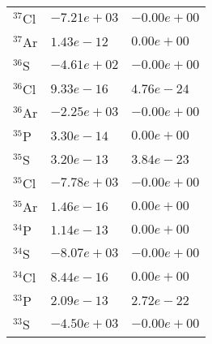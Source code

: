 \begin{tabular}{lll}
 $^{37}$Cl & $-7.21e+03 $                                                       & $-0.00e+00 $                                                          \\
 $^{37}$Ar & $1.43e-12 $                                                        & $0.00e+00 $                                                           \\
 $^{36}$S  & $-4.61e+02 $                                                       & $-0.00e+00 $                                                          \\
 $^{36}$Cl & $9.33e-16 $                                                        & $4.76e-24 $                                                           \\
 $^{36}$Ar & $-2.25e+03 $                                                       & $-0.00e+00 $                                                          \\
 $^{35}$P  & $3.30e-14 $                                                        & $0.00e+00 $                                                           \\
 $^{35}$S  & $3.20e-13 $                                                        & $3.84e-23 $                                                           \\
 $^{35}$Cl & $-7.78e+03 $                                                       & $-0.00e+00 $                                                          \\
 $^{35}$Ar & $1.46e-16 $                                                        & $0.00e+00 $                                                           \\
 $^{34}$P  & $1.14e-13 $                                                        & $0.00e+00 $                                                           \\
 $^{34}$S  & $-8.07e+03 $                                                       & $-0.00e+00 $                                                          \\
 $^{34}$Cl & $8.44e-16 $                                                        & $0.00e+00 $                                                           \\
 $^{33}$P  & $2.09e-13 $                                                        & $2.72e-22 $                                                           \\
 $^{33}$S  & $-4.50e+03 $                                                       & $-0.00e+00 $                                                          \\

\end{tabular}
